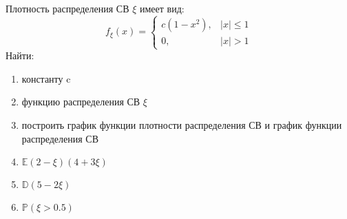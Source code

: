 \begin{problem}
Плотность распределения СВ \(\xi\) имеет вид:
\[
    f_\xi(x) = \begin{cases}
        c(1 - x^2), & |x| \leqslant 1 \\
        0,          & | x | > 1
    \end{cases}
\]
Найти:
\begin{enumerate}[label=\alph*)]
    \item константу c
    \item функцию распределения СВ \(\xi\)
    \item построить график функции плотности распределения СВ и график функции распределения СВ
    \item \(\mathbb{E}(2 - \xi)(4 + 3\xi)\)
    \item \(\mathbb{D}(5 - 2\xi)\)
    \item \(\mathbb{P}(\xi > 0.5)\)
\end{enumerate}
\end{problem}

